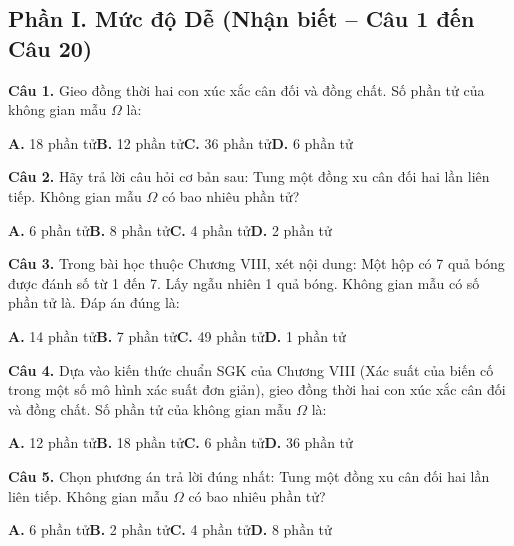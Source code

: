 \documentclass[11pt,a4paper]{article}
\begin{document}
\subsection*{\color{accent} Phần I. Mức độ Dễ (Nhận biết -- Câu 1 đến Câu 20)}
\textbf{\color{primary} Câu 1.} Gieo đồng thời hai con xúc xắc cân đối và đồng chất. Số phần tử của không gian mẫu $\Omega$ là:\par
\hspace*{1.5em}\textbf{A.} 18 phần tử\quad\quad \textbf{B.} 12 phần tử\quad\quad \textbf{C.} 36 phần tử\quad\quad \textbf{D.} 6 phần tử\par\vspace{2pt}
\textbf{\color{primary} Câu 2.} Hãy trả lời câu hỏi cơ bản sau: Tung một đồng xu cân đối hai lần liên tiếp. Không gian mẫu $\Omega$ có bao nhiêu phần tử?\par
\hspace*{1.5em}\textbf{A.} 6 phần tử\quad\quad \textbf{B.} 8 phần tử\quad\quad \textbf{C.} 4 phần tử\quad\quad \textbf{D.} 2 phần tử\par\vspace{2pt}
\textbf{\color{primary} Câu 3.} Trong bài học thuộc Chương VIII, xét nội dung: Một hộp có 7 quả bóng được đánh số từ 1 đến 7. Lấy ngẫu nhiên 1 quả bóng. Không gian mẫu có số phần tử là. Đáp án đúng là:\par
\hspace*{1.5em}\textbf{A.} 14 phần tử\quad\quad \textbf{B.} 7 phần tử\quad\quad \textbf{C.} 49 phần tử\quad\quad \textbf{D.} 1 phần tử\par\vspace{2pt}
\textbf{\color{primary} Câu 4.} Dựa vào kiến thức chuẩn SGK của Chương VIII (Xác suất của biến cố trong một số mô hình xác suất đơn giản), gieo đồng thời hai con xúc xắc cân đối và đồng chất. Số phần tử của không gian mẫu $\Omega$ là:\par
\hspace*{1.5em}\textbf{A.} 12 phần tử\quad\quad \textbf{B.} 18 phần tử\quad\quad \textbf{C.} 6 phần tử\quad\quad \textbf{D.} 36 phần tử\par\vspace{2pt}
\textbf{\color{primary} Câu 5.} Chọn phương án trả lời đúng nhất: Tung một đồng xu cân đối hai lần liên tiếp. Không gian mẫu $\Omega$ có bao nhiêu phần tử?\par
\hspace*{1.5em}\textbf{A.} 6 phần tử\quad\quad \textbf{B.} 2 phần tử\quad\quad \textbf{C.} 4 phần tử\quad\quad \textbf{D.} 8 phần tử\par\vspace{2pt}
\end{document}
